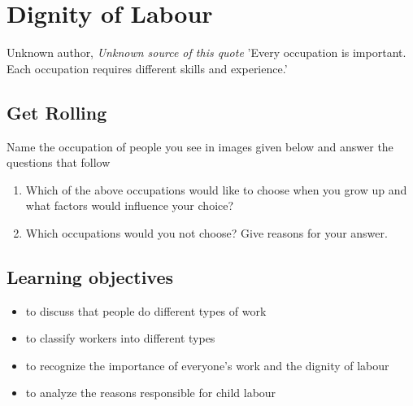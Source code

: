 \chapter{Dignity of Labour}

\begin{chapquote}{Unknown author, \textit{Unknown source of this quote}}
'Every occupation is important. Each occupation requires different skills and experience.'
\end{chapquote}

\section{Get Rolling}
Name the occupation of people you see in images given below and answer the questions that follow
\begin{enumerate}
    \item Which of the above occupations would like to choose when you grow up and what factors would influence your choice?
    \item Which occupations would you not choose? Give reasons for your answer.
\end{enumerate}
\section{Learning objectives}
\begin{itemize}
    \item to discuss that people do different types of work
    \item to classify workers into different types
    \item to recognize the importance of everyone's work and the dignity of labour
    \item to analyze the reasons responsible for child labour    
\end{itemize}
